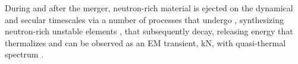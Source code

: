 During and after the merger, neutron-rich material is ejected on the 
dynamical \citep{Rosswog:1998hy,Hotokezaka:2013b,Bauswein:2013yna,Wanajo:2014wha,Radice:2018pdn} 
and secular \citep{Lee:2009,Perego:2014fma,Fernandez:2015use,Siegel:2017nub,Fujibayashi:2017puw,Fernandez:2018kax,Miller:2019dpt} 
timescales via a number of processes %
that 
undergo \rproc{} \nuc{}, synthesizing neutron-rich unstable elements 
\citep{Eichler:1989ve,Wanajo:2014wha,Cowan:2019pkx},
that subsequently decay, releasing energy that thermalizes and can be observed as 
an \ac{EM} transient, \ac{kN}, with quasi-thermal spectrum \citep{Metzger:2019zeh}. 
%



